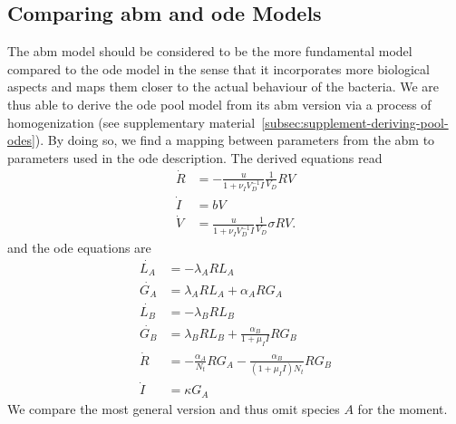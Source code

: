 \documentclass[10pt,twocolumn,5p]{elsarticle}
\numberwithin{equation}{section}
\begin{document}
\subsection{Comparing \acs{abm} and \acs{ode} Models}
The \ac{abm} model should be considered to be the more fundamental model compared to the \ac{ode} model in the sense that it incorporates more biological aspects and maps them closer to the actual behaviour of the bacteria.
We are thus able to derive the \ac{ode} pool model from its \ac{abm} version via a process of homogenization (see supplementary material~\ref{subsec:supplement-deriving-pool-odes}).
By doing so, we find a mapping between parameters from the \ac{abm} to parameters used in the \ac{ode} description.
The derived equations read
\begin{align}
    \dot{R} &= -\frac{u}{1+\nu_I V_D^{-1}I} \frac{1}{V_D} R V\\
    \dot{I} &= b V\\
    \dot{V} &= \frac{u}{1+\nu_I V_D^{-1} I} \frac{1}{V_D}\sigma R V.
\end{align}
and the \ac{ode} equations are
\begin{align}
    \dot{L_A} &= -\lambda_A R L_A\\
    \dot{G_A} &= \lambda_A R L_A + \alpha_A R G_A\\
    \dot{L_B} &= -\lambda_B R L_B\\
    \dot{G_B} &= \lambda_B R L_B + \frac{\alpha_B}{1 + \mu_I I} R G_B\\
    \dot{R} &= -\frac{\alpha_A}{N_t} R G_A-\frac{\alpha_B}{(1 + \mu_I I) N_t} R G_B \\
    \dot{I} &= \kappa G_A
\end{align}
We compare the most general version and thus omit species $A$ for the moment.
\end{document}
